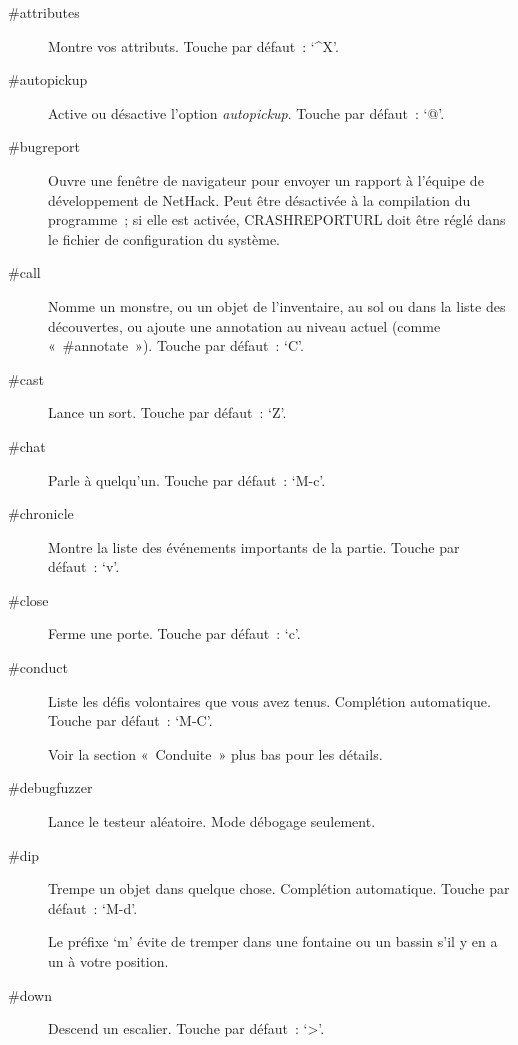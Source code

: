 \documentclass[titlepage]{article}
\begin{document}
\begin{description}
\item[{\#attributes}]
Montre vos attributs.
Touche par défaut~: `\textasciicircum{}X'.

\item[{\#autopickup}]
Active ou désactive l'option
\textit{autopickup}.
Touche par défaut~: `@'.

\item[{\#bugreport}]
Ouvre une fenêtre de navigateur pour envoyer un rapport à l'équipe de
développement de NetHack.
Peut être désactivée à la compilation du programme~; si elle est
activée, CRASHREPORTURL doit être réglé dans le fichier de configuration
du système.

\item[{\#call}]
Nomme un monstre, ou un objet de l'inventaire, au sol ou dans la liste des
découvertes, ou ajoute une annotation au niveau actuel (comme
«~\#annotate~»).
Touche par défaut~: `C'.

\item[{\#cast}]
Lance un sort.
Touche par défaut~: `Z'.

\item[{\#chat}]
Parle à quelqu'un.
Touche par défaut~: `M-c'.

\item[{\#chronicle}]
Montre la liste des événements importants de la partie.
Touche par défaut~: `v'.

\item[{\#close}]
Ferme une porte.
Touche par défaut~: `c'.

\item[{\#conduct}]
Liste les défis volontaires que vous avez tenus.
Complétion automatique.
Touche par défaut~: `M-C'.


Voir la section «~Conduite~» plus bas pour les détails.

\item[{\#debugfuzzer}]
Lance le testeur aléatoire.
Mode débogage seulement.

\item[{\#dip}]
Trempe un objet dans quelque chose.
Complétion automatique.
Touche par défaut~: `M-d'.


Le préfixe `m' évite de tremper dans une fontaine ou un bassin s'il y
en a un à votre position.

\item[{\#down}]
Descend un escalier.
Touche par défaut~: `\textgreater{}'.


\end{description}
\end{document}

